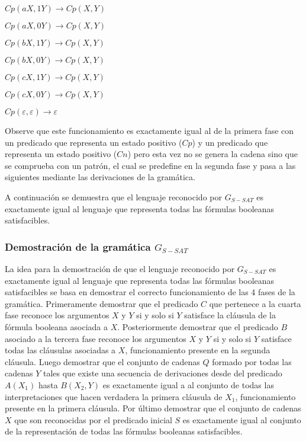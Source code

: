 \begin{itemize}
\begin{enumerate}[start=23]
\begin{multicols}{2}
                  \item $Cp(aX,1Y) \to Cp(X,Y)$
                  \item $Cp(aX,0Y) \to Cp(X,Y)$
                  \item $Cp(bX,1Y) \to Cp(X,Y)$
                  \item $Cp(bX,0Y) \to Cp(X,Y)$
                  \item $Cp(cX,1Y) \to Cp(X,Y)$
                  \item $Cp(cX,0Y) \to Cp(X,Y)$
                  \item $Cp(\varepsilon,\varepsilon)\to \varepsilon$
              \end{multicols}
          \end{enumerate}

          Observe que este funcionamiento es exactamente igual al de la primera fase con un predicado que
          representa un estado positivo ($Cp$) y un predicado que representa un estado positivo ($Cn$)
          pero esta vez no se genera la cadena sino que se comprueba con un patrón, el cual se predefine
          en la segunda fase y pasa a las siguientes mediante las derivaciones de la gramática.

\end{itemize}

A continuación se demuestra que el lenguaje reconocido por $G_{S-SAT}$ es exactamente igual al lenguaje que representa
todas las fórmulas booleanas satisfacibles.

\subsubsection{Demostración de la gramática $G_{S-SAT}$}

La idea para la demostración de que el lenguaje reconocido por $G_{S-SAT}$ es exactamente igual al lenguaje que representa
todas las fórmulas booleanas satisfacibles se basa en demostrar el correcto funcionamiento de las 4 fases de la gramática. Primeramente
demostrar que el predicado $C$ que pertenece a la cuarta fase reconoce los argumentos $X$ y $Y$ si y solo si
$Y$ satisface la cláusula de la fórmula booleana asociada a $X$. Posteriormente demostrar que el predicado $B$ asociado
a la tercera fase reconoce los argumentos $X$ y $Y$ si y solo si $Y$ satisface todas las cláusulas asociadas a $X$, funcionamiento presente en la segunda cláusula.
Luego demostrar que el conjunto de cadenas $Q$ formado por todas las cadenas $Y$ tales que existe una secuencia de
derivaciones desde del predicado $A(X_1)$ hasta $B(X_2,Y)$ es exactamente igual a al conjunto de todas las interpretaciones
que hacen verdadera la primera cláusula de $X_1$, funcionamiento presente en la primera cláusula. Por último demostrar que el
conjunto de cadenas $X$ que son reconocidas por el predicado inicial $S$ es exactamente igual al conjunto de la
representación de todas las fórmulas booleanas satisfacibles.

